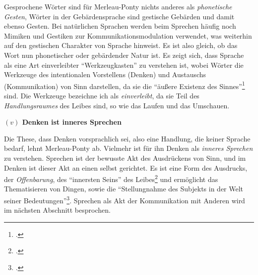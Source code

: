 \documentclass[a4paper, 12pt]{article}
\begin{document}
\begin{onehalfspace}
Gesprochene Wörter sind für Merleau-Ponty nichts anderes als \emph{phonetische Gesten}, Wörter in der Gebärdensprache sind gestische Gebärden und damit ebenso Gesten. Bei natürlichen Sprachen werden beim Sprechen häufig noch Mimiken und Gestiken zur Kommunikationsmodulation verwendet, was weiterhin auf den gestischen Charakter von Sprache hinweist. Es ist also gleich, ob das Wort nun phonetischer oder gebärdender Natur ist. Es zeigt sich, dass Sprache als eine Art einverleibter "`Werkzeugkasten"' zu verstehen ist, wobei Wörter die Werkzeuge des intentionalen Vorstellens (Denken) und Austauschs (Kommunikation) von Sinn darstellen, da sie die "`äußere Existenz des Sinnes"'\footnote{\Cite[Siehe][S. 216]{merleau1966phanomenologie}.} sind. Die Werkzeuge bezeichne ich als \emph{einverleibt}, da sie Teil des \emph{Handlungsraumes} des Leibes sind, so wie das Laufen und das Umschauen.

\vspace{5mm}

\noindent\textbf{$(v)$ Denken ist inneres Sprechen}

\noindent Die These, dass Denken vorsprachlich sei, also eine Handlung, die keiner Sprache bedarf, lehnt Merleau-Ponty ab. Vielmehr ist für ihn Denken als \emph{inneres Sprechen} zu verstehen. Sprechen ist der bewusste Akt des Ausdrückens von Sinn, und im Denken ist dieser Akt an einen selbst gerichtet. Es ist eine Form des Ausdrucks, der \emph{Offenbarung}, des "`innersten Seins"' des Leibes\footnote{\Cite[Vgl.][S. 232]{merleau1966phanomenologie}.} und ermöglicht das Thematisieren von Dingen, sowie die "`Stellungnahme des Subjekts in der Welt seiner Bedeutungen"'\footnote{\Cite[Siehe][S. 229]{merleau1966phanomenologie}.}. Sprechen als Akt der Kommunikation mit Anderen wird im nächsten Abschnitt besprochen. 


\end{onehalfspace}
\end{document}
